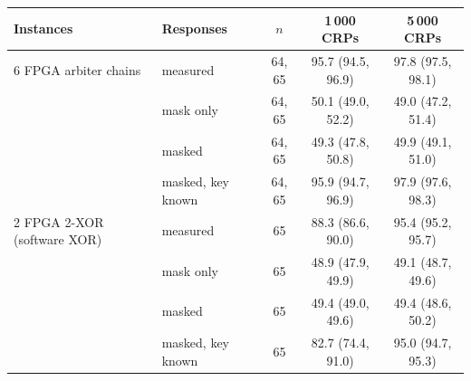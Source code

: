 \begin{tabular}{llccc}
\toprule
Instances & Responses & $n$ & 1\,000 CRPs & 5\,000 CRPs \\
\midrule
6 FPGA arbiter chains & measured & 64, 65 & 95.7 (94.5, 96.9) & 97.8 (97.5, 98.1) \\
 & mask only & 64, 65 & 50.1 (49.0, 52.2) & 49.0 (47.2, 51.4) \\
 & masked & 64, 65 & 49.3 (47.8, 50.8) & 49.9 (49.1, 51.0) \\
 & masked, key known & 64, 65 & 95.9 (94.7, 96.9) & 97.9 (97.6, 98.3) \\
\midrule
2 FPGA 2-XOR (software XOR) & measured & 65 & 88.3 (86.6, 90.0) & 95.4 (95.2, 95.7) \\
 & mask only & 65 & 48.9 (47.9, 49.9) & 49.1 (48.7, 49.6) \\
 & masked & 65 & 49.4 (49.0, 49.6) & 49.4 (48.6, 50.2) \\
 & masked, key known & 65 & 82.7 (74.4, 91.0) & 95.0 (94.7, 95.3) \\
\bottomrule
\end{tabular}
